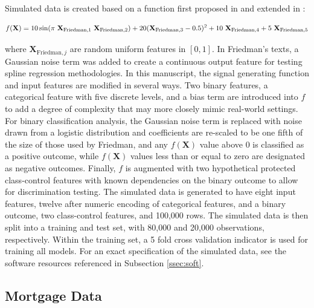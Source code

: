 \documentclass[information,article,submit,moreauthors,pdftex]{definitions/mdpi}
\begin{document}
Simulated data is created based on a function first proposed in \citet{friedman1979tree} and extended in \citet{friedman1991multivariate}:

\begin{equation}
\begin{aligned}\label{eq:sim}\small
f(\mathbf{X}) = 10\sin(\pi~\mathbf{X}_{\text{Friedman},1}~\mathbf{X}_{\text{Friedman},2}) + 20(\mathbf{X}_{\text{Friedman},3} - 0.5)^2 + 10~\mathbf{X}_{\text{Friedman},4} + 5~\mathbf{X}_{\text{Friedman},5}
\end{aligned}
\end{equation}

\noindent where $\mathbf{X}_{\text{Friedman},j}$ are random uniform features in $[0,1]$. In Friedman's texts, a Gaussian noise term was added to create a continuous output feature for testing spline regression methodologies. In this manuscript, the signal generating function and input features are modified in several ways.  Two binary features, a categorical feature with five discrete levels, and a bias term are introduced into $f$ to add a degree of complexity that may more closely mimic real-world settings. 
For binary classification analysis, the Gaussian noise term is replaced with noise drawn from a logistic distribution and coefficients are re-scaled to be one fifth of the size of those used by Friedman, and any $f(\mathbf{X})$ value above 0 is classified as a positive outcome, while $f(\mathbf{X})$ values less than or equal to zero are designated as negative outcomes.  Finally, $f$ is augmented with two hypothetical protected class-control features with known dependencies on the binary outcome to allow for discrimination testing. The simulated data is generated to have eight input features, twelve after numeric encoding of categorical features, and a binary outcome, two class-control features, and 100,000 rows. The simulated data is then split into a training and test set, with 80,000 and 20,000 observations, respectively.  Within the training set, a 5 fold cross validation indicator is used for training all models. For an exact specification of the simulated data, see the software resources referenced in Subsection \ref{ssec:soft}. 

\subsection{Mortgage Data}\label{ssec:mort_data}
\end{document}

